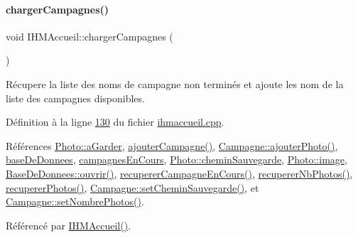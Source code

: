 \paragraph{\texorpdfstring{charger\+Campagnes()}{chargerCampagnes()}}
{\footnotesize\ttfamily void I\+H\+M\+Accueil\+::charger\+Campagnes (\begin{DoxyParamCaption}{ }\end{DoxyParamCaption})\hspace{0.3cm}{\ttfamily [private]}}



Récupere la liste des noms de campagne non terminés et ajoute les nom de la liste des campagnes disponibles. 



Définition à la ligne \hyperlink{ihmaccueil_8cpp_source_l00130}{130} du fichier \hyperlink{ihmaccueil_8cpp_source}{ihmaccueil.\+cpp}.



Références \hyperlink{ihmalbumphoto_8h_source_l00024}{Photo\+::a\+Garder}, \hyperlink{ihmaccueil_8cpp_source_l00254}{ajouter\+Campagne()}, \hyperlink{campagne_8cpp_source_l00080}{Campagne\+::ajouter\+Photo()}, \hyperlink{ihmaccueil_8h_source_l00040}{base\+De\+Donnees}, \hyperlink{ihmaccueil_8h_source_l00039}{campagnes\+En\+Cours}, \hyperlink{ihmalbumphoto_8h_source_l00025}{Photo\+::chemin\+Sauvegarde}, \hyperlink{ihmalbumphoto_8h_source_l00022}{Photo\+::image}, \hyperlink{basededonnees_8cpp_source_l00063}{Base\+De\+Donnees\+::ouvrir()}, \hyperlink{ihmaccueil_8cpp_source_l00120}{recuperer\+Campagne\+En\+Cours()}, \hyperlink{ihmaccueil_8cpp_source_l00115}{recuperer\+Nb\+Photos()}, \hyperlink{ihmaccueil_8cpp_source_l00125}{recuperer\+Photos()}, \hyperlink{campagne_8cpp_source_l00060}{Campagne\+::set\+Chemin\+Sauvegarde()}, et \hyperlink{campagne_8cpp_source_l00065}{Campagne\+::set\+Nombre\+Photos()}.



Référencé par \hyperlink{ihmaccueil_8cpp_source_l00014}{I\+H\+M\+Accueil()}.


